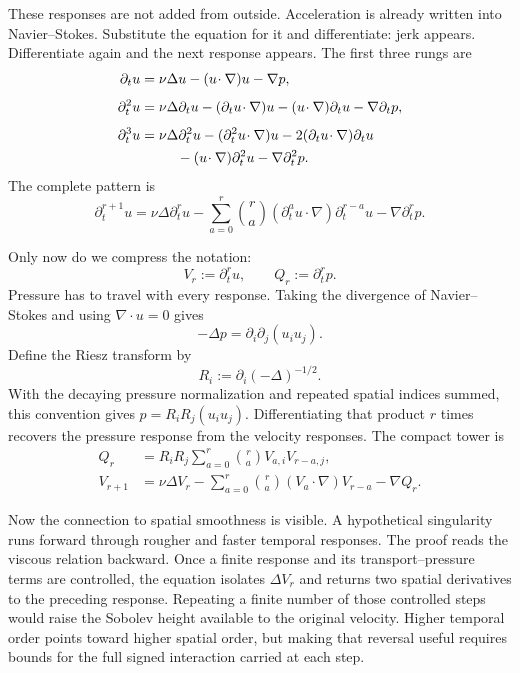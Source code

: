 These responses are not added from outside.  Acceleration is already written
into Navier--Stokes.  Substitute the equation for it and differentiate: jerk
appears.  Differentiate again and the next response appears.  The first three
rungs are
\[
\begin{aligned}
\partial_tu
&=\nu\Delta u-(u\!\cdot\nabla)u-\nabla p,\\[4pt]
\partial_t^2u
&=\nu\Delta\partial_tu
  -(\partial_tu\!\cdot\nabla)u
  -(u\!\cdot\nabla)\partial_tu
  -\nabla\partial_tp,\\[4pt]
\partial_t^3u
&=\nu\Delta\partial_t^2u
  -(\partial_t^2u\!\cdot\nabla)u
  -2(\partial_tu\!\cdot\nabla)\partial_tu\\
&\hspace{2.6em}
  -(u\!\cdot\nabla)\partial_t^2u
  -\nabla\partial_t^2p.
\end{aligned}
\]
The complete pattern is
\[
\partial_t^{r+1}u
=\nu\Delta\partial_t^ru
-\sum_{a=0}^{r}\binom ra
  (\partial_t^au\!\cdot\nabla)\partial_t^{r-a}u
-\nabla\partial_t^rp.
\]

Only now do we compress the notation:
\[
V_r:=\partial_t^ru,
\qquad
Q_r:=\partial_t^rp.
\]
Pressure has to travel with every response.  Taking the divergence of
Navier--Stokes and using \(\nabla\!\cdot u=0\) gives
\[
-\Delta p=\partial_i\partial_j(u_i u_j).
\]
Define the Riesz transform by
\[
R_i:=\partial_i(-\Delta)^{-1/2}.
\]
With the decaying pressure normalization and repeated spatial indices summed,
this convention gives
\(p=R_iR_j(u_i u_j)\).  Differentiating that product \(r\) times recovers
the pressure response from the velocity responses.  The compact tower is
\[
\begin{aligned}
Q_r
&=R_iR_j\sum_{a=0}^{r}\binom ra V_{a,i}V_{r-a,j},\\
V_{r+1}
&=\nu\Delta V_r
  -\sum_{a=0}^{r}\binom ra(V_a\!\cdot\nabla)V_{r-a}
  -\nabla Q_r.
\end{aligned}
\]

Now the connection to spatial smoothness is visible.  A hypothetical
singularity runs forward through rougher and faster temporal responses.  The
proof reads the viscous relation backward.  Once a finite response and its
transport--pressure terms are controlled, the equation isolates
\(\Delta V_r\) and returns two spatial derivatives to the preceding response.
Repeating a finite number of those controlled steps would raise the Sobolev
height available to the original velocity.  Higher temporal order points toward
higher spatial order, but making that reversal useful requires bounds for the
full signed interaction carried at each step.

